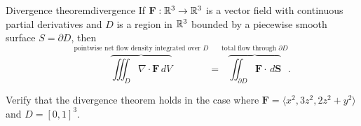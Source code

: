 \documentclass[svgnames]{watsonbook}
\begin{document}
\begin{theo}{Divergence theorem}{divergence}
  If $\mathbf{F} : \mathbb{R}^3 \to \mathbb{R}^3$ is a vector field with continuous
  partial derivatives and $D$ is a region in $\mathbb{R}^3$ bounded by a
  piecewise smooth surface $S = \partial D$, then 
  \[
    \overbrace{\iiint_D \nabla \cdot \mathbf{F} \,
      dV}^{\text{pointwise net flow density
        integrated over $D$}} = \overbrace{\iint_{\partial D}
    \mathbf{F} \cdot \, d\mathbf{S}}^{\text{total flow through
      $\partial D$}}. 
  \]
\end{theo}

\begin{example}{}{}
  Verify that the divergence theorem holds in the case where
  $\mathbf{F} = \langle x^2, 3z^2, 2z^2 + y^2 \rangle$ and $D = [0,1]^3$. 
\end{example}
\end{document}
